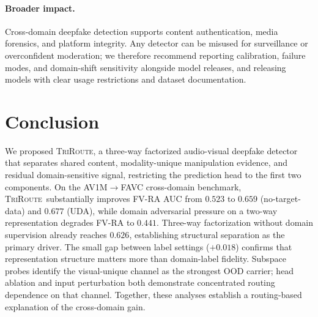 \documentclass{article}
\newcommand{\method}{\textsc{TriRoute}}
\begin{document}
\paragraph{Broader impact.}
Cross-domain deepfake detection supports content authentication, media forensics, and platform integrity. Any detector can be misused for surveillance or overconfident moderation; we therefore recommend reporting calibration, failure modes, and domain-shift sensitivity alongside model releases, and releasing models with clear usage restrictions and dataset documentation.

\section{Conclusion}

We proposed \method, a three-way factorized audio-visual deepfake detector that separates shared content, modality-unique manipulation evidence, and residual domain-sensitive signal, restricting the prediction head to the first two components. On the AV1M$\rightarrow$FAVC cross-domain benchmark, \method\ substantially improves FV-RA AUC from $0.523$ to $0.659$ (no-target-data) and $0.677$ (UDA), while domain adversarial pressure on a two-way representation degrades FV-RA to $0.441$. Three-way factorization without domain supervision already reaches $0.626$, establishing structural separation as the primary driver. The small gap between label settings ($+0.018$) confirms that representation structure matters more than domain-label fidelity. Subspace probes identify the visual-unique channel as the strongest OOD carrier; head ablation and input perturbation both demonstrate concentrated routing dependence on that channel. Together, these analyses establish a routing-based explanation of the cross-domain gain.




\newpage

\end{document}
